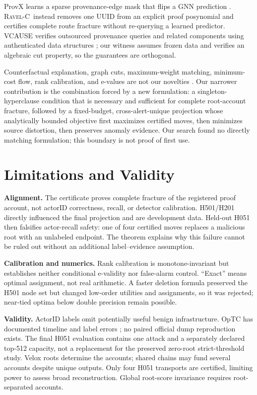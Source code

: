 \documentclass[runningheads]{llncs}
\newcommand{\ravelc}{\textsc{Ravel-C}}
\begin{document}
ProvX learns a sparse provenance-edge mask that flips a GNN prediction \cite{wu2025provx}. \ravelc\ instead removes one UUID from an explicit proof posynomial and certifies complete route fracture without re-querying a learned predictor. VCAUSE verifies outsourced provenance queries and related components using authenticated data structures \cite{song2026vcause}; our witness assumes frozen data and verifies an algebraic cut property, so the guarantees are orthogonal.

Counterfactual explanation, graph cuts, maximum-weight matching, minimum-cost flow, rank calibration, and e-values are not our novelties \cite{vovk2021evalues}. Our narrower contribution is the combination forced by a new formulation: a singleton-hyperclause condition that is necessary and sufficient for complete root-account fracture, followed by a fixed-budget, cross-alert-unique projection whose analytically bounded objective first maximizes certified moves, then minimizes source distortion, then preserves anomaly evidence. Our search found no directly matching formulation; this boundary is not proof of first use.

\section{Limitations and Validity}

\textbf{Alignment.} The certificate proves complete fracture of the registered proof account, not actorID correctness, recall, or detector calibration. H501/H201 directly influenced the final projection and are development data. Held-out H051 then falsifies actor-recall safety: one of four certified moves replaces a malicious root with an unlabeled endpoint. The theorem explains why this failure cannot be ruled out without an additional label--evidence assumption.

\textbf{Calibration and numerics.} Rank calibration is monotone-invariant but establishes neither conditional e-validity nor false-alarm control. ``Exact'' means optimal assignment, not real arithmetic. A faster deletion formula preserved the H501 node set but changed low-order utilities and assignments, so it was rejected; near-tied optima below double precision remain possible.

\textbf{Validity.} ActorID labels omit potentially useful benign infrastructure. OpTC has documented timeline and label errors \cite{majorczyk2025newhope}; no paired official dump reproduction exists. The final H051 evaluation contains one attack and a separately declared top-512 capacity, not a replacement for the preserved zero-root strict-threshold study. Velox roots determine the accounts; shared chains may fund several accounts despite unique outputs. Only four H051 transports are certified, limiting power to assess broad reconstruction. Global root-score invariance requires root-separated accounts.
\end{document}
